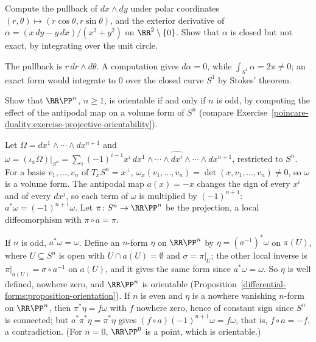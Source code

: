 \begin{exercise}\label{differential-forms:exercise-pullback-computation}
Compute the pullback of $dx \wedge dy$ under polar coordinates $(r, \theta) \mapsto (r\cos\theta, r\sin\theta)$, and the exterior derivative of $\alpha = (x\,dy - y\,dx)/(x^2 + y^2)$ on $\RR^2 \setminus \{0\}$.
Show that $\alpha$ is closed but not exact, by integrating over the unit circle.
\end{exercise}

\begin{solution}
The pullback is $r\,dr \wedge d\theta$. A computation gives $d\alpha = 0$, while $\int_{S^1}\alpha = 2\pi \neq 0$; an exact form would integrate to $0$ over the closed curve $S^1$ by Stokes' theorem.
\end{solution}

\begin{exercise}\label{differential-forms:exercise-orientability-projective}
Show that $\RR\PP^n$, $n \geq 1$, is orientable if and only if $n$ is odd, by computing the effect of the antipodal map on a volume form of $S^n$ (compare
Exercise~\ref{poincare-duality:exercise-projective-orientability}).
\end{exercise}

\begin{solution}
Let $\Omega = dx^1 \wedge \cdots \wedge dx^{n+1}$ and $\omega = (\iota_x\Omega)|_{S^n} = \sum_i(-1)^{i-1}x^i\,dx^1 \wedge \cdots \wedge \widehat{dx^i} \wedge \cdots \wedge dx^{n+1}$, restricted to $S^n$.
For a basis $v_1, \ldots, v_n$ of $T_xS^n = x^\perp$, $\omega_x(v_1, \ldots, v_n) = \det(x, v_1, \ldots, v_n) \neq 0$, so $\omega$ is a volume form. The antipodal map $a(x) = -x$ changes the sign of every
$x^i$ and of every $dx^j$, so each term of $\omega$ is multiplied by $(-1)^{n+1}$: $a^*\omega = (-1)^{n+1}\omega$. Let $\pi \colon S^n \to \RR\PP^n$ be the projection, a local diffeomorphism with
$\pi \circ a = \pi$.

If $n$ is odd, $a^*\omega = \omega$. Define an $n$-form $\eta$ on $\RR\PP^n$ by $\eta = (\sigma^{-1})^*\omega$ on $\pi(U)$, where $U \subseteq S^n$ is open with $U \cap a(U) = \emptyset$ and
$\sigma = \pi|_U$; the other local inverse is $\pi|_{a(U)} = \sigma \circ a^{-1}$ on $a(U)$, and it gives the same form since $a^*\omega = \omega$. So $\eta$ is well defined, nowhere zero, and
$\RR\PP^n$ is orientable (Proposition~\ref{differential-forms:proposition-orientation}). If $n$ is even and $\eta$ is a nowhere vanishing $n$-form on $\RR\PP^n$, then $\pi^*\eta = f\omega$ with $f$
nowhere zero, hence of constant sign since $S^n$ is connected; but $a^*\pi^*\eta = \pi^*\eta$ gives $(f \circ a)(-1)^{n+1}\omega = f\omega$, that is, $f \circ a = -f$, a contradiction. (For
$n = 0$, $\RR\PP^0$ is a point, which is orientable.)
\end{solution}

